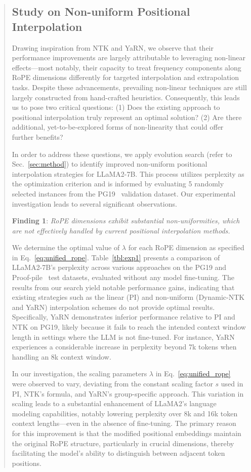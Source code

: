 \begin{abstract}
\subsection{Study on Non-uniform Positional Interpolation}

Drawing inspiration from NTK and YaRN, we observe that their performance improvements are largely attributable to leveraging non-linear effects—most notably, their capacity to treat frequency components along RoPE dimensions differently for targeted interpolation and extrapolation tasks. Despite these advancements, prevailing non-linear techniques are still largely constructed from hand-crafted heuristics. Consequently, this leads us to pose two critical questions: (1) Does the existing approach to positional interpolation truly represent an optimal solution? (2) Are there additional, yet-to-be-explored forms of non-linearity that could offer further benefits?

In order to address these questions, we apply evolution search (refer to Sec.~\ref{sec:method}) to identify improved non-uniform positional interpolation strategies for LLaMA2-7B. This process utilizes perplexity as the optimization criterion and is informed by evaluating 5 randomly selected instances from the PG19~\cite{pg19} validation dataset. Our experimental investigation leads to several significant observations.

\textbf{Finding 1}: \textit{RoPE dimensions exhibit substantial non-uniformities, which are not effectively handled by current positional interpolation methods.}

We determine the optimal value of $\lambda$ for each RoPE dimension as specified in Eq.~\ref{eq:unified_rope}. Table~\ref{tbl:exp1} presents a comparison of LLaMA2-7B's perplexity across various approaches on the PG19 and Proof-pile~\cite{proof-pile} test datasets, evaluated without any model fine-tuning. The results from our search yield notable performance gains, indicating that existing strategies such as the linear (PI) and non-uniform (Dynamic-NTK and YaRN) interpolation schemes do not provide optimal results. Specifically, YaRN demonstrates inferior performance relative to PI and NTK on PG19, likely because it fails to reach the intended context window length in settings where the LLM is not fine-tuned. For instance, YaRN experiences a considerable increase in perplexity beyond 7k tokens when handling an 8k context window.

In our investigation, the scaling parameters $\lambda$ in Eq.~\ref{eq:unified_rope} were observed to vary, deviating from the constant scaling factor $s$ used in PI, NTK’s formula, and YaRN’s group-specific approach. This variation in scaling leads to a substantial enhancement of LLaMA2’s language modeling capabilities, notably lowering perplexity over 8k and 16k token context lengths—even in the absence of fine-tuning. The primary reason for this improvement is that the modified positional embeddings maintain the original RoPE structure, particularly in crucial dimensions, thereby facilitating the model's ability to distinguish between adjacent token positions.


\end{abstract}
